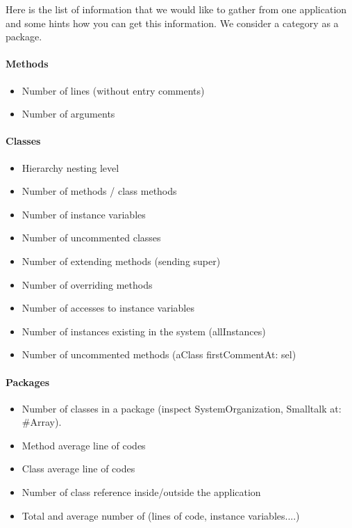 Here is the list of information that we would like to gather from one application and some hints how you can get this information. We consider a category as a package.

\paragraph{Methods}
\begin{itemize}
\item Number of lines (without entry comments)
\item Number of arguments
\end{itemize}

\paragraph{Classes}
\begin{itemize}
\item Hierarchy nesting level
\item Number of methods / class methods
\item Number of instance variables
\item Number of uncommented classes 
\item Number of extending methods (sending super)
\item Number of overriding methods 
\item Number of accesses to instance variables
\item Number of instances existing in the system (allInstances)
\item Number of uncommented methods (aClass firstCommentAt: sel)
\end{itemize}


\paragraph{Packages}
\begin{itemize}
\item Number of classes in a package (inspect SystemOrganization, Smalltalk at: \#Array).
\item Method average  line of codes
\item Class average line of codes
\item Number of class reference inside/outside the application
\item Total and average number of (lines of code, instance variables....)
\end{itemize}

\ifx\wholebook\relax\else\fi
